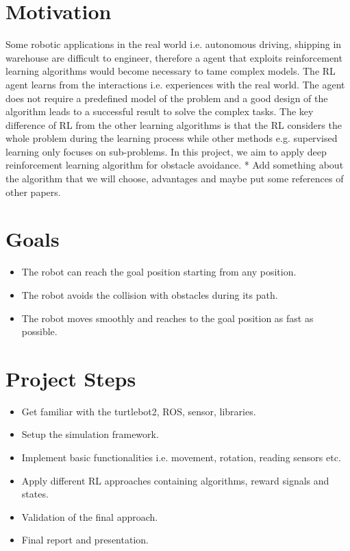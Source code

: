 \documentclass[12pt,a4paper]{article}
\begin{document}
\section{Motivation}
Some robotic applications in the real world i.e. autonomous driving, shipping in warehouse are difficult to engineer, therefore a agent that exploits reinforcement learning algorithms would become necessary to tame complex models. The RL agent learns from the interactions i.e. experiences with the real world. The agent does not require a predefined model of the problem and a good design of the algorithm leads to a successful result to solve the complex tasks. The key difference of RL from the other learning algorithms is that the RL considers the whole problem during the learning process while other methods e.g. supervised learning only focuses on sub-problems. In this project, we aim to apply deep reinforcement learning algorithm for obstacle avoidance.
* Add something about the algorithm that we will choose, advantages and maybe put some references of other papers.

\section{Goals}
\begin{itemize}
\item The robot can reach the goal position starting from any position.
\item The robot avoids the collision with obstacles during its path.
\item The robot moves smoothly and reaches to the goal position as fast as possible.
\end{itemize}

\section{Project Steps}
\begin{itemize}
\item Get familiar with the turtlebot2, ROS, sensor, libraries.
\item Setup the simulation framework.
\item Implement basic functionalities i.e. movement, rotation, reading sensors etc.
\item Apply different RL approaches containing algorithms, reward signals and states.
\item Validation of the final approach.
\item Final report and presentation.
\end{itemize}
\end{document}
